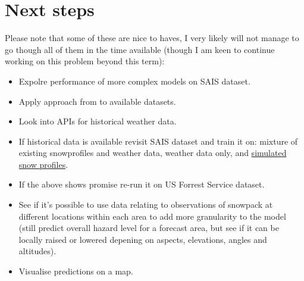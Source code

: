 \documentclass{article}
\begin{document}
\section{Next steps}
	Please note that some of these are nice to haves, I very likely will not manage to go though all of them in the time available (though I am keen to continue working on this problem beyond this term):
	\begin{itemize}
		\item Expolre performance of more complex models on SAIS dataset. 
		\item Apply approach from \cite{nhess-22-2031-2022} to available datasets.
		\item Look into APIs for historical weather data.
		\item If historical data is available revisit SAIS dataset and train it on: mixture of existing snowprofiles and weather data, weather data only, and \href{https://snowpack.slf.ch}{simulated snow profiles}.
		\item If the above shows promise re-run it on US Forrest Service dataset.
		\item See if it's possible to use data relating to observations of snowpack at different locations within each area to add more granularity to the model (still predict overall hazard level for a forecast area, but see if it can be locally raised or lowered depening on aspects, elevations, angles and altitudes).
		\item Visualise predictions on a map.
	\end{itemize}
\end{document}

